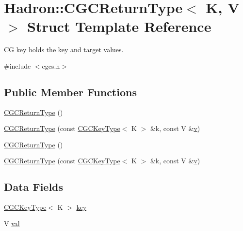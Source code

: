 \hypertarget{structHadron_1_1CGCReturnType}{}\section{Hadron\+:\+:C\+G\+C\+Return\+Type$<$ K, V $>$ Struct Template Reference}
\label{structHadron_1_1CGCReturnType}


CG key holds the key and target values.  




{\ttfamily \#include $<$cgcs.\+h$>$}

\subsection*{Public Member Functions}
\begin{DoxyCompactItemize}
\item 
\mbox{\hyperlink{structHadron_1_1CGCReturnType_a47df1076ea565f8d6c6126f26707aa21}{C\+G\+C\+Return\+Type}} ()
\item 
\mbox{\hyperlink{structHadron_1_1CGCReturnType_ad8d827992553e890df5f1e05876cc63e}{C\+G\+C\+Return\+Type}} (const \mbox{\hyperlink{structHadron_1_1CGCKeyType}{C\+G\+C\+Key\+Type}}$<$ K $>$ \&k, const V \&\mbox{\hyperlink{hadron__timeslice_8cc_a716fc87f5e814be3ceee2405ed6ff22a}{v}})
\item 
\mbox{\hyperlink{structHadron_1_1CGCReturnType_a47df1076ea565f8d6c6126f26707aa21}{C\+G\+C\+Return\+Type}} ()
\item 
\mbox{\hyperlink{structHadron_1_1CGCReturnType_ad8d827992553e890df5f1e05876cc63e}{C\+G\+C\+Return\+Type}} (const \mbox{\hyperlink{structHadron_1_1CGCKeyType}{C\+G\+C\+Key\+Type}}$<$ K $>$ \&k, const V \&\mbox{\hyperlink{hadron__timeslice_8cc_a716fc87f5e814be3ceee2405ed6ff22a}{v}})
\end{DoxyCompactItemize}
\subsection*{Data Fields}
\begin{DoxyCompactItemize}
\item 
\mbox{\hyperlink{structHadron_1_1CGCKeyType}{C\+G\+C\+Key\+Type}}$<$ K $>$ \mbox{\hyperlink{structHadron_1_1CGCReturnType_a1101bfc0c0d7cd166d32992058e4aa6c}{key}}
\item 
V \mbox{\hyperlink{structHadron_1_1CGCReturnType_ae84be939a57b9598ac24e018e399cc38}{val}}
\end{DoxyCompactItemize}



